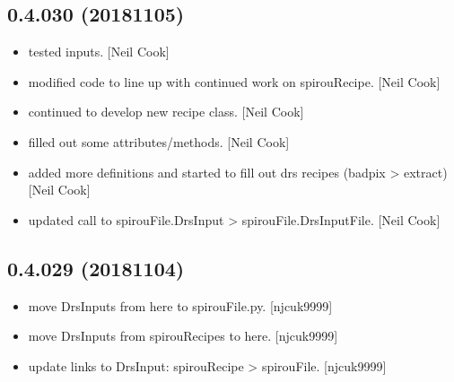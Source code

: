 \documentclass[a4paper,10pt,english]{report}
\begin{document}
\subsection{0.4.030 (2018\sphinxhyphen{}11\sphinxhyphen{}05)}
\label{\detokenize{misc/changelog:id288}}\begin{itemize}
\item {} 
 \sphinxhyphen{} tested  inputs. {[}Neil Cook{]}

\item {} 
 \sphinxhyphen{} modified code to line up with continued work on
spirouRecipe. {[}Neil Cook{]}

\item {} 
 \sphinxhyphen{} continued to develop new recipe class. {[}Neil Cook{]}

\item {} 
 \sphinxhyphen{} filled out some attributes/methods. {[}Neil Cook{]}

\item {} 
 \sphinxhyphen{} added more definitions and started to fill out drs
recipes (badpix \textendash{}\textgreater{} extract) {[}Neil Cook{]}

\item {} 
 \sphinxhyphen{} updated call to spirouFile.DrsInput \textendash{}\textgreater{}
spirouFile.DrsInputFile. {[}Neil Cook{]}

\end{itemize}


\subsection{0.4.029 (2018\sphinxhyphen{}11\sphinxhyphen{}04)}
\label{\detokenize{misc/changelog:id289}}\begin{itemize}
\item {} 
 \sphinxhyphen{} move DrsInputs from here to spirouFile.py.
{[}njcuk9999{]}

\item {} 
 \sphinxhyphen{} move DrsInputs from spirouRecipes to here. {[}njcuk9999{]}

\item {} 
 \sphinxhyphen{} update links to DrsInput: spirouRecipe \textendash{}\textgreater{}
spirouFile. {[}njcuk9999{]}

\end{itemize}
\end{document}
